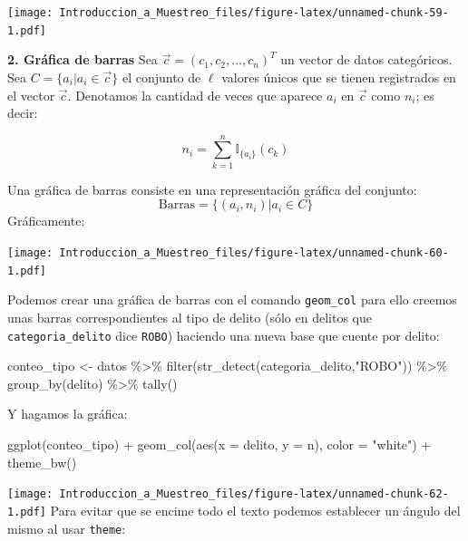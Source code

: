 \documentclass[
]{book}
\newenvironment{Shaded}{\begin{snugshade}}{\end{snugshade}}
\newcommand{\AttributeTok}[1]{\textcolor[rgb]{0.77,0.63,0.00}{#1}}
\newcommand{\FunctionTok}[1]{\textcolor[rgb]{0.00,0.00,0.00}{#1}}
\newcommand{\NormalTok}[1]{#1}
\newcommand{\OtherTok}[1]{\textcolor[rgb]{0.56,0.35,0.01}{#1}}
\newcommand{\SpecialCharTok}[1]{\textcolor[rgb]{0.00,0.00,0.00}{#1}}
\newcommand{\StringTok}[1]{\textcolor[rgb]{0.31,0.60,0.02}{#1}}
\begin{document}
\texttt{[image: Introduccion\_a\_Muestreo\_files/figure-latex/unnamed-chunk-59-1.pdf]}

\textbf{2. Gráfica de barras} Sea \(\vec{c} = (c_1, c_2, \dots, c_n)^T\) un vector de datos categóricos. Sea \(C = \{ a_i | a_i \in \vec{c} \}\) el conjunto de \(\ell\) valores únicos que se tienen registrados en el vector \(\vec{c}\). Denotamos la cantidad de veces que aparece \(a_i\) en \(\vec{c}\) como \(n_i\); es decir:

\[
n_i = \sum\limits_{k = 1}^n \mathbb{I}_{\{a_i\}}(c_k)
\]

Una gráfica de barras consiste en una representación gráfica del conjunto:
\[
\text{Barras} = \{ (a_i, n_i) | a_i \in C  \}
\]
Gráficamente:

\texttt{[image: Introduccion\_a\_Muestreo\_files/figure-latex/unnamed-chunk-60-1.pdf]}

Podemos crear una gráfica de barras con el comando \texttt{geom\_col} para ello creemos unas barras correspondientes al tipo de delito (sólo en delitos que \texttt{categoria\_delito} dice \texttt{ROBO}) haciendo una nueva base que cuente por delito:

\begin{Shaded}
\begin{Highlighting}[]
\NormalTok{conteo\_tipo }\OtherTok{\textless{}{-}}\NormalTok{ datos }\SpecialCharTok{\%\textgreater{}\%} \FunctionTok{filter}\NormalTok{(}\FunctionTok{str\_detect}\NormalTok{(categoria\_delito,}\StringTok{"ROBO"}\NormalTok{)) }\SpecialCharTok{\%\textgreater{}\%} 
  \FunctionTok{group\_by}\NormalTok{(delito) }\SpecialCharTok{\%\textgreater{}\%} \FunctionTok{tally}\NormalTok{()}
\end{Highlighting}
\end{Shaded}

Y hagamos la gráfica:

\begin{Shaded}
\begin{Highlighting}[]
\FunctionTok{ggplot}\NormalTok{(conteo\_tipo) }\SpecialCharTok{+}
  \FunctionTok{geom\_col}\NormalTok{(}\FunctionTok{aes}\NormalTok{(}\AttributeTok{x =}\NormalTok{ delito, }\AttributeTok{y =}\NormalTok{ n), }\AttributeTok{color =} \StringTok{"white"}\NormalTok{) }\SpecialCharTok{+}
  \FunctionTok{theme\_bw}\NormalTok{()}
\end{Highlighting}
\end{Shaded}

\texttt{[image: Introduccion\_a\_Muestreo\_files/figure-latex/unnamed-chunk-62-1.pdf]}
Para evitar que se encime todo el texto podemos establecer un ángulo del mismo al usar \texttt{theme}:
\end{document}
